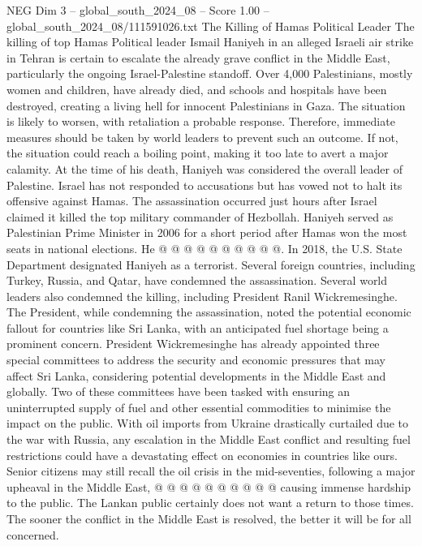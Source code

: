 \begin{textsample}{NEG Dim 3 – global\_south\_2024\_08 – Score 1.00 – global\_south\_2024\_08/111591026.txt}  \label{ex:f3_neg_130}
The Killing of Hamas Political Leader The killing of top Hamas Political leader Ismail Haniyeh in an alleged Israeli air strike in Tehran is certain to escalate the already grave conflict in the Middle East, particularly the ongoing Israel-Palestine standoff.
Over 4,000 Palestinians, mostly women and children, have already died, and schools and hospitals have been destroyed, creating a living hell for innocent Palestinians in Gaza.
The situation is likely to worsen, with retaliation a probable response.
Therefore, immediate measures should be taken by world leaders to prevent such an outcome.
If not, the situation could reach a boiling point, making it too late to avert a major calamity.
At the time of his death, Haniyeh was considered the overall leader of Palestine.
Israel has not responded to accusations but has vowed not to halt its offensive against Hamas.
The assassination occurred just hours after Israel claimed it killed the top military commander of Hezbollah.
Haniyeh served as Palestinian Prime Minister in 2006 for a short period after Hamas won the most seats in national elections.
He @ @ @ @ @ @ @ @ @ @.
In 2018, the U.S.
State Department designated Haniyeh as a terrorist.
Several foreign countries, including Turkey, Russia, and Qatar, have condemned the assassination.
Several world leaders also condemned the killing, including President Ranil Wickremesinghe.
The President, while condemning the assassination, noted the potential economic fallout for countries like Sri Lanka, with an anticipated fuel shortage being a prominent concern.
President Wickremesinghe has already appointed three special committees to address the security and economic pressures that may affect Sri Lanka, considering potential developments in the Middle East and globally.
Two of these committees have been tasked with ensuring an uninterrupted supply of fuel and other essential commodities to minimise the impact on the public.
With oil imports from Ukraine drastically curtailed due to the war with Russia, any escalation in the Middle East conflict and resulting fuel restrictions could have a devastating effect on economies in countries like ours.
Senior citizens may still recall the oil crisis in the mid-seventies, following a major upheaval in the Middle East, @ @ @ @ @ @ @ @ @ @ causing immense hardship to the public.
The Lankan public certainly does not want a return to those times.
The sooner the conflict in the Middle East is resolved, the better it will be for all concerned.

\end{textsample}
